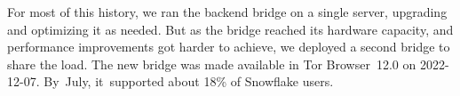 \documentclass[letterpaper,twocolumn]{article}
\begin{document}
For most of this history,
we ran the backend bridge on a single server,
upgrading and optimizing it as needed.
But as the bridge reached its hardware capacity,
and performance improvements got harder to achieve,
we deployed a second bridge to share the load.
The new bridge was made available in
Tor Browser~12.0 on \mbox{2022-12-07}.
By~July, it~supported about 18\% of Snowflake users.
\end{document}
